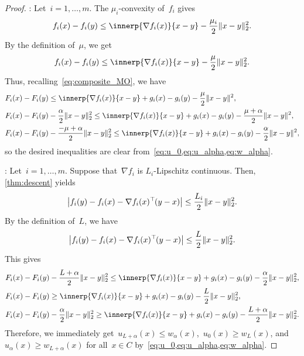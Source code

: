 \documentclass[../main]{subfiles}
\begin{document}
\begin{proof}
    :
Let~$i = 1, \dots, m$.
The $\mu_i$-convexity of~$f_i$ gives
\[
    f_i(x) - f_i(y) \le \innerp{\nabla f_i(x)}{x - y} - \frac{\mu_i}{2} \norm{x - y}_2^2
.\]
By the definition of~$\mu$, we get
\[
    f_i(x) - f_i(y) \le \innerp{\nabla f_i(x)}{x - y} - \frac{\mu}{2} \norm{x - y}_2^2
.\]
Thus, recalling~\cref{eq:composite_MO}, we have
\begin{align}
    &F_i(x) - F_i(y) \le \innerp{\nabla f_i(x)}{x - y} + g_i(x) - g_i(y) - \frac{\mu}{2} \norm{x - y}^2, \\
    &F_i(x) - F_i(y) - \frac{\alpha}{2}\norm{x - y}_2^2 \le \innerp{\nabla f_i(x)}{x - y} + g_i(x) - g_i(y) - \frac{\mu + \alpha}{2} \norm{x - y}^2, \\
    &F_i(x) - F_i(y) - \frac{- \mu + \alpha}{2}\norm{x - y}_2^2 \le \innerp{\nabla f_i(x)}{x - y} + g_i(x) - g_i(y) - \frac{\alpha}{2} \norm{x - y}^2
,\end{align}
so the desired inequalities are clear from~\cref{eq:u_0,eq:u_alpha,eq:w_alpha}.

:
Let~$i = 1, \dots, m$.
Suppose that~$\nabla f_i$ is $L_i$-Lipschitz continuous.
Then, \cref{thm:descent} yields
\[
    \abs*{f_i(y) - f_i(x) - \nabla f_i(x)^\T (y - x)} \le \frac{L_i}{2}\norm{x - y}_2^2.
\]
By the definition of~$L$, we have
\[
    \abs*{f_i(y) - f_i(x) - \nabla f_i(x)^\T (y - x)} \le \frac{L}{2}\norm{x - y}_2^2.
\]
This gives
\begin{align}
    &F_i(x) - F_i(y) - \frac{L + \alpha}{2} \norm{x - y}_2^2 \le \innerp{\nabla f_i(x)}{x - y} + g_i(x) - g_i(y) - \frac{\alpha}{2} \norm{x - y}_2^2, \\
    &F_i(x) - F_i(y) \ge \innerp{\nabla f_i(x)}{x - y} + g_i(x) - g_i(y) - \frac{L}{2} \norm{x - y}_2^2, \\
    &F_i(x) - F_i(y) - \frac{\alpha}{2} \norm{x - y}_2^2 \ge \innerp{\nabla f_i(x)}{x - y} + g_i(x) - g_i(y) - \frac{L + \alpha}{2} \norm{x - y}_2^2
.\end{align}
Therefore, we immediately get~$u_{L + \alpha}(x) \le w_\alpha(x)$,~$u_0(x) \ge w_L(x)$, and~$u_\alpha(x) \ge w_{L + \alpha}(x)$ for all~$x \in C$ by~\cref{eq:u_0,eq:u_alpha,eq:w_alpha}.
\end{proof}
\end{document}
